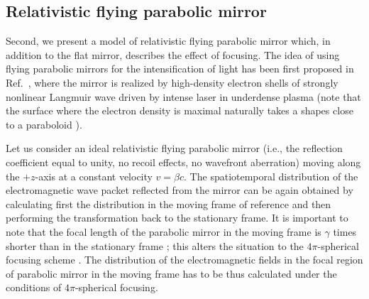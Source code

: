 \documentclass[10pt, a4paper, twoside, openright]{report}
\begin{document}
\subsection{Relativistic flying parabolic mirror\label{sec:rfpm}}


Second, we present a model of relativistic flying parabolic mirror which, in addition to the flat mirror, describes the effect of focusing. The idea of using flying parabolic mirrors for the intensification of light has been first proposed in Ref.~, where the mirror is realized by high-density electron shells of strongly nonlinear Langmuir wave driven by intense laser in underdense plasma (note that the surface where the electron density is maximal naturally takes a shapes close to a paraboloid \cite{Bulanov1991, Bulanov1995, Matlis2006, Shadwick2002, Maksimchuk2008}).

Let us consider an ideal relativistic flying parabolic mirror (i.e., the reflection coefficient equal to unity, no recoil effects, no wavefront aberration) moving along the $ +z $-axis at a constant velocity $ v = \beta c $. The spatiotemporal distribution of the electromagnetic wave packet reflected from the mirror can be again obtained by calculating first the distribution in the moving frame of reference and then performing the transformation back to the stationary frame. It is important to note that the focal length of the parabolic mirror in the moving frame is $ \gamma $ times shorter than in the stationary frame \cite{Bulanov2011, Jeong2021}; this alters the situation to the $ 4 \pi $-spherical focusing scheme \cite{Gonoskov2012, Jeong2020}. The distribution of the electromagnetic fields in the focal region of parabolic mirror in the moving frame has to be thus calculated under the conditions of $ 4 \pi $-spherical focusing.
\end{document}
